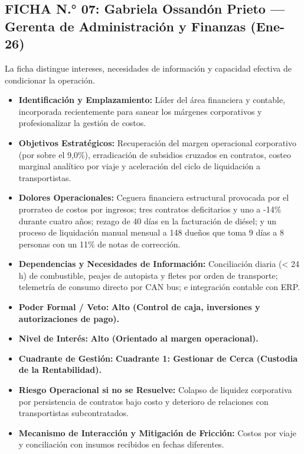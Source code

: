 \subsection*{FICHA N.° 07: Gabriela Ossandón Prieto — Gerenta de Administración y Finanzas (Ene-26)}
La ficha distingue intereses, necesidades de información y capacidad efectiva de condicionar la operación.
\begin{itemize}
\item \textbf{Identificación y Emplazamiento:} Líder del área financiera y contable, incorporada recientemente para sanear los márgenes corporativos y profesionalizar la gestión de costos.
\item \textbf{Objetivos Estratégicos:} Recuperación del margen operacional corporativo (por sobre el 9,0\%), erradicación de subsidios cruzados en contratos, costeo marginal analítico por viaje y aceleración del ciclo de liquidación a transportistas.
\item \textbf{Dolores Operacionales:} Ceguera financiera estructural provocada por el prorrateo de costos por ingresos; tres contratos deficitarios y uno a -14\% durante cuatro años; rezago de 40 días en la facturación de diésel; y un proceso de liquidación manual mensual a 148 dueños que toma 9 días a 8 personas con un 11\% de notas de corrección.
\item \textbf{Dependencias y Necesidades de Información:} Conciliación diaria (< 24 h) de combustible, peajes de autopista y fletes por orden de transporte; telemetría de consumo directo por CAN bus; e integración contable con ERP.
\item \textbf{Poder Formal / Veto:} \textbf{Alto (Control de caja, inversiones y autorizaciones de pago).}
\item \textbf{Nivel de Interés:} \textbf{Alto (Orientado al margen operacional).}
\item \textbf{Cuadrante de Gestión:} \textbf{Cuadrante 1: Gestionar de Cerca (Custodia de la Rentabilidad).}
\item \textbf{Riesgo Operacional si no se Resuelve:} Colapso de liquidez corporativa por persistencia de contratos bajo costo y deterioro de relaciones con transportistas subcontratados.
\item \textbf{Mecanismo de Interacción y Mitigación de Fricción:} Costos por viaje y conciliación con insumos recibidos en fechas diferentes.
\end{itemize}
